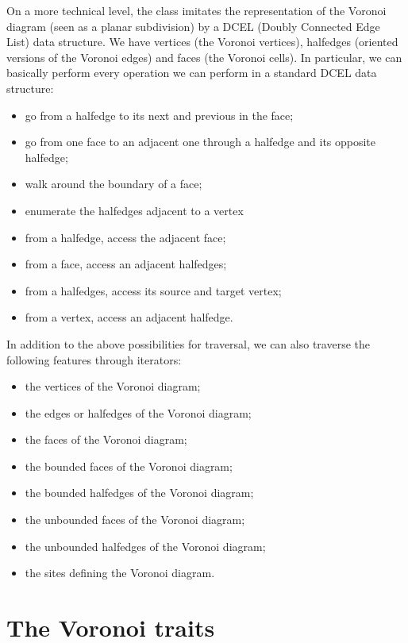 On a more technical level, the 
class imitates the representation of the Voronoi diagram (seen as a
planar subdivision) by a DCEL (Doubly Connected Edge List) data
structure. We have vertices (the Voronoi vertices), halfedges
(oriented versions of the Voronoi edges) and faces (the Voronoi
cells). In particular, we can basically perform every operation we can
perform in a standard DCEL data structure:
\begin{itemize}
\item go from a halfedge to its next and previous in the face;
\item go from one face to an adjacent one through a halfedge and its
  opposite halfedge;
\item walk around the boundary of a face;
\item enumerate the halfedges adjacent to a vertex
\item from a halfedge, access the adjacent face;
\item from a face, access an adjacent halfedges;
\item from a halfedges, access its source and target vertex;
\item from a vertex, access an adjacent halfedge.
\end{itemize}
In addition to the above possibilities for traversal, we can also
traverse the following features through iterators:
\begin{itemize}
\item the vertices of the Voronoi diagram;
\item the edges or halfedges of the Voronoi diagram;
\item the faces of the Voronoi diagram;
\item the bounded faces of the Voronoi diagram;
\item the bounded halfedges of the Voronoi diagram;
\item the unbounded faces of the Voronoi diagram;
\item the unbounded halfedges of the Voronoi diagram;
\item the sites defining the Voronoi diagram.
\end{itemize}


\section{The Voronoi traits}
\label{sec:vda2-traits}

